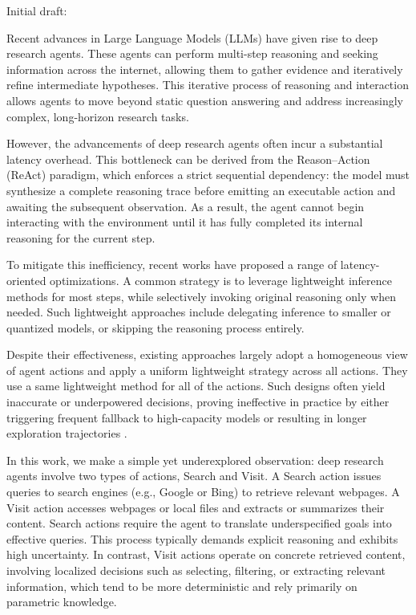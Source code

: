 \iffalse
Initial draft:

Recent advances in Large Language Models (LLMs) have given rise to deep research agents. These agents can perform multi-step reasoning and seeking information across the internet, allowing them to gather evidence and iteratively refine intermediate hypotheses\cite{team2025mirothinker,team2025tongyi}.
This iterative process of reasoning and interaction allows agents to move beyond static question answering and address increasingly complex, long-horizon research tasks.

However, the advancements of deep research agents often incur a substantial latency overhead. This bottleneck can be derived from the Reason–Action (ReAct) paradigm\cite{yao2022react}, which enforces a strict sequential dependency: the model must synthesize a complete reasoning trace before emitting an executable action and awaiting the subsequent observation. As a result, the agent cannot begin interacting with the environment until it has fully completed its internal reasoning for the current step.

To mitigate this inefficiency, recent works have proposed a range of latency-oriented optimizations. 
A common strategy is to leverage lightweight inference methods for most steps, while selectively invoking original reasoning only when needed\cite{guan2025dynamic}. Such lightweight approaches include delegating inference to smaller or quantized models\cite{bian2025limits}, or skipping the reasoning process entirely\cite{huang2025reducing}.

Despite their effectiveness, existing approaches largely adopt a homogeneous view of agent actions and apply a uniform lightweight strategy across all actions. They use a same lightweight method for all of the actions. Such designs often yield inaccurate or underpowered decisions, proving ineffective in practice by either triggering frequent fallback to high-capacity models or resulting in longer exploration trajectories \cite{lin2025towards}.

In this work, we make a simple yet underexplored observation: deep research agents involve two types of actions, Search and Visit. A Search action issues queries to search engines (e.g., Google or Bing) to retrieve relevant webpages. A Visit action accesses webpages or local files and extracts or summarizes their content. Search actions require the agent to translate underspecified goals into effective queries. This process typically demands explicit reasoning and exhibits high uncertainty.
In contrast, Visit actions operate on concrete retrieved content, involving localized decisions such as selecting, filtering, or extracting relevant information, which tend to be more deterministic and rely primarily on parametric knowledge.

